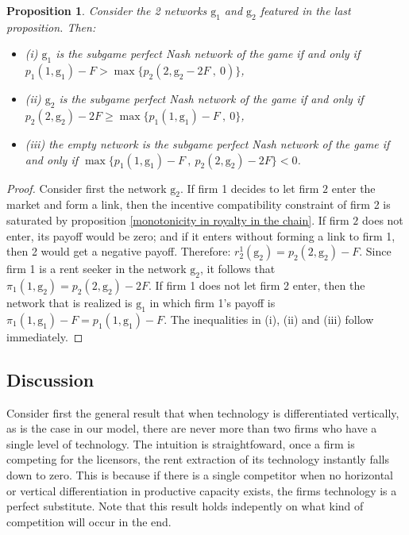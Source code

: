\documentclass{article}
\newtheorem{proposition}{Proposition}
\begin{document}
\begin{proposition}
Consider the 2 networks $\text{g}_1$ and $\text{g}_2$ featured in the last proposition. Then:
\begin{itemize}
\item[] (i) $\text{g}_1$ is the subgame perfect Nash network of the game if and only if $p_1(1,\text{g}_1)-F> \max\{p_2(2,\text{g}_2-2F~,~0)\}$,
\item[] (ii) $\text{g}_2$ is the subgame perfect Nash network of the game if and only if $p_2(2,\text{g}_2)-2F\geq \max\{p_1(1,\text{g}_1)-F~,~0\}$, 
\item[] (iii) the empty network is the subgame perfect Nash network of the game if and only if $\max\{p_1(1,\text{g}_1)-F~,~ p_2(2,\text{g}_2)-2F\}<0$. 
\end{itemize}
\end{proposition} 
\begin{proof}
Consider first the network $\text{g}_2$. If firm 1 decides to let firm $2$ enter the market and form a link, then the incentive compatibility constraint of firm 2 is saturated by proposition \ref{monotonicity in royalty in the chain}. If firm $2$ does not enter, its payoff would be zero; and if it enters without forming a link to firm 1, then 2 would get a negative payoff. Therefore: $r^1_2(\text{g}_2)=p_2(2,\text{g}_2)-F$. Since firm 1 is a rent seeker in the network $\text{g}_2$, it follows that $\pi_1(1,\text{g}_2)=p_2(2,\text{g}_2)-2F$. If firm 1 does not let firm 2 enter, then the network that is realized is $\text{g}_1$ in which firm 1's payoff is $\pi_1(1,\text{g}_1)-F=p_1(1,\text{g}_1)-F$. The inequalities in (i), (ii) and (iii) follow immediately.  
\end{proof}

\subsection{Discussion}
Consider first the general result that when technology is differentiated vertically, as is the case in our model, there are never more than two firms who have a single level of technology. The intuition is straightfoward, once a firm is competing for the licensors, the rent extraction of its technology instantly falls down to zero. This is because if there is a single competitor when no horizontal or vertical differentiation in productive capacity exists, the firms technology is a perfect substitute. Note that this result holds indepently on what kind of competition will occur in the end. 
\end{document}
